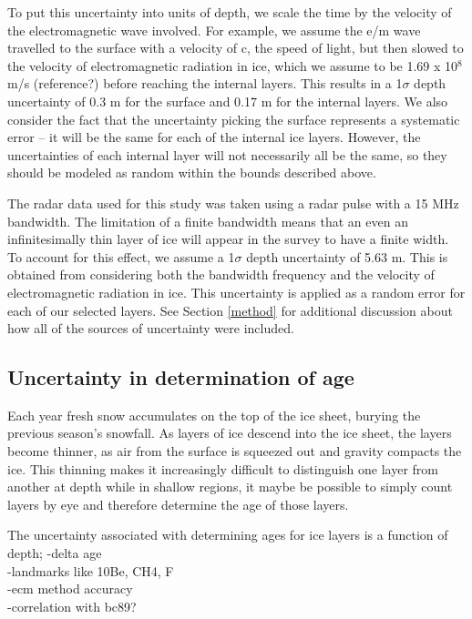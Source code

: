 \documentclass[draft,jgrga]{agutex}
\begin{document}
To put this uncertainty into units of depth, we scale the time by
the velocity of the electromagnetic wave involved. For example, we
assume the e/m wave travelled to the surface with a velocity of c, the
speed of light, but then slowed to the velocity of electromagnetic
radiation in ice, which we assume to be 1.69 x 10$^8$ m/s (reference?)
before reaching the internal layers. This results in a 1$\sigma$ depth
uncertainty of 0.3 m for the surface and 0.17 m for the internal
layers. We also consider the fact that the uncertainty picking the
surface represents a systematic error -- it will be the same for each
of the internal ice layers. However, the uncertainties of each
internal layer will not necessarily all be the same, so they should be
modeled as random within the bounds described above.

The radar data used for this study was taken using a radar pulse with
a 15 MHz bandwidth. The limitation of a finite bandwidth means that
an even an infinitesimally thin layer of ice will appear in the survey
to have a finite width. To account for this effect, we assume a
1$\sigma$ depth uncertainty of 5.63 m. This is obtained from considering both
the bandwidth frequency and the velocity of electromagnetic radiation
in ice. This uncertainty is applied as a random error for each of our selected
layers. See Section \ref{method} for additional discussion about how
all of the sources of uncertainty were included.



\subsection{Uncertainty in determination of age}\label{ageunc}

Each year fresh snow accumulates on the top of the ice sheet,
burying the previous season's snowfall. As layers of ice descend into
the ice sheet, the layers become thinner, as air from the surface is
squeezed out and gravity compacts the ice. This thinning makes it
increasingly difficult to distinguish one layer from another at
depth while in shallow regions, it maybe be possible to simply count
layers by eye and therefore determine the age of those layers. 

The uncertainty associated with determining ages for ice layers is a
function of depth;
-delta age \\
-landmarks like 10Be, CH4, F \\
-ecm method accuracy \\
-correlation with bc89? \\
\end{document}
